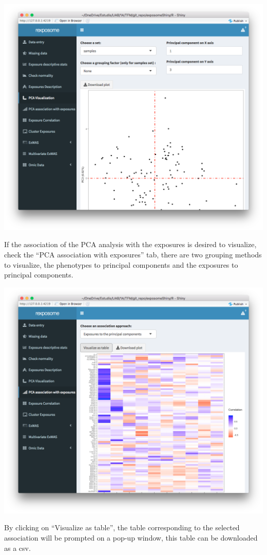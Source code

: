 \documentclass[
]{book}
\begin{document}
\includegraphics{images/analysis5_2.png}

If the association of the PCA analysis with the exposures is desired to visualize, check the ``PCA association with exposures'' tab, there are two grouping methods to visualize, the phenotypes to principal components and the exposures to principal components.

\includegraphics{images/analysis5_3.png}

By clicking on ``Visualize as table'', the table corresponding to the selected association will be prompted on a pop-up window, this table can be downloaded as a csv.
\end{document}
